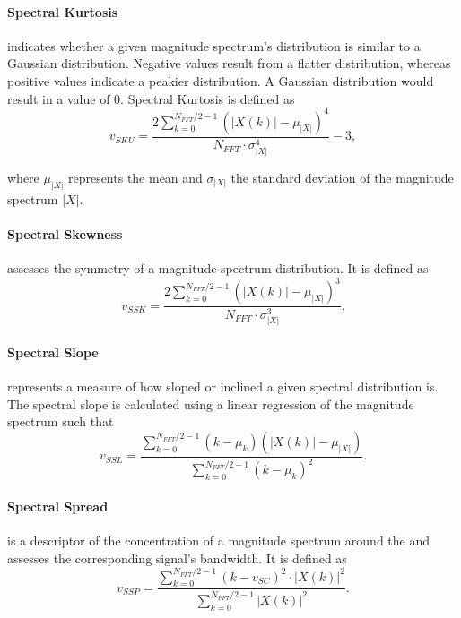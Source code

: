 \paragraph*{Spectral Kurtosis}
\label{para:kurtosis}
indicates whether a given magnitude spectrum's distribution is similar to a
Gaussian distribution. Negative values result from a flatter distribution,
whereas positive values indicate a peakier distribution. A Gaussian
distribution would result in a value of 0. Spectral Kurtosis is defined as
\begin{equation}
  v_{SKU} = \frac{ 2 \sum\limits_{k=0}^{N_{FFT}/2-1} (|X(k)|
  - \mu_{|X|})^4 }
  { N_{FFT}\cdot{\sigma_{|X|}^4} } - 3,
\end{equation}

where $\mu_{|X|}$ represents the mean and $\sigma_{|X|}$ the standard deviation
of the magnitude spectrum $|X|$.

\paragraph*{Spectral Skewness}
\label{para:skewness}
assesses the symmetry of a magnitude spectrum distribution. It is defined as
\begin{equation}
  v_{SSK} = \frac{ 2 \sum\limits_{k=0}^{N_{FFT}/2-1} (|X(k)|
  - \mu_{|X|})^3 }
  { N_{FFT}\cdot{\sigma_{|X|}^3} }.
\end{equation}

\paragraph*{Spectral Slope}
\label{para:slope}
represents a measure of how sloped or inclined a given spectral distribution is.
The spectral slope is calculated using a linear regression of the magnitude
spectrum such that
\begin{equation}
  v_{SSL} = \frac{ \sum\limits_{k=0}^{N_{FFT}/2-1} (k - \mu_{k}) (|X(k)|
  - \mu_{|X|}) }
  { \sum\limits_{k=0}^{N_{FFT}/2-1} (k - \mu_{k})^2 }.
\end{equation}

\paragraph*{Spectral Spread}
\label{para:spread}
is a descriptor of the concentration of a magnitude spectrum around the
 and assesses the corresponding signal's bandwidth. It is
defined as
\begin{equation}
  v_{SSP} = \frac{ \sum\limits_{k=0}^{N_{FFT}/2-1} (k - v_{SC})^2
  \cdot{ |X(k)|^2 } }
  { \sum\limits_{k=0}^{N_{FFT}/2-1} |X(k)|^2 }.
\end{equation}

